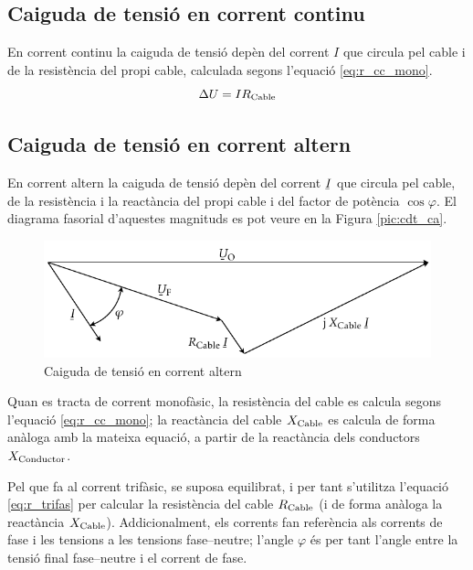 \subsection{Caiguda de tensi\'{o} en corrent continu}

En corrent continu la caiguda de tensi\'{o} dep\`{e}n del corrent $I$ que circula pel cable i de la  resist\`{e}ncia del propi cable, calculada segons l'equaci\'{o} \eqref{eq:r_cc_mono}.
\begin{equation}
   \Delta U = I R_\mathrm{Cable}
\end{equation}

\subsection{Caiguda de tensi\'{o} en corrent altern}

En corrent altern la caiguda de tensi\'{o}
dep\`{e}n del  corrent $\cmplx{I}$ que circula pel cable, de la
resist\`{e}ncia i la react\`{a}ncia del propi cable i del factor de
pot\`{e}ncia $\cos \varphi$. El diagrama fasorial d'aquestes magnituds
es pot veure en la Figura \vref{pic:cdt_ca}.
\begin{figure}[htb]
   \centering
   \includegraphics{Imatges/Cap-Cables-Caiguda-Tensio.pdf}
   \caption{Caiguda de tensi\'{o} en corrent altern}\label{pic:cdt_ca}
\end{figure}

Quan es tracta de corrent monof\`{a}sic, la resist\`{e}ncia del cable es calcula segons l'equaci\'{o}
\eqref{eq:r_cc_mono}; la react\`{a}ncia del cable $X_\mathrm{Cable}$ es calcula de forma an\`{a}loga
amb la mateixa equaci\'{o}, a partir de la react\`{a}ncia dels conductors $X_\mathrm{Conductor}$.

Pel que fa al corrent trif\`{a}sic, se suposa equilibrat, i per tant s'utilitza l'equaci\'{o}
\eqref{eq:r_trifas} per calcular la resist\`{e}ncia del cable $R_\mathrm{Cable}$ (i de forma
an\`{a}loga la react\`{a}ncia $X_\mathrm{Cable}$). Addicionalment, els corrents fan refer\`{e}ncia als
corrents de fase i les tensions a les tensions fase--neutre; l'angle $\varphi$ \'{e}s per
tant l'angle entre la tensi\'{o} final fase--neutre i el corrent de fase.

